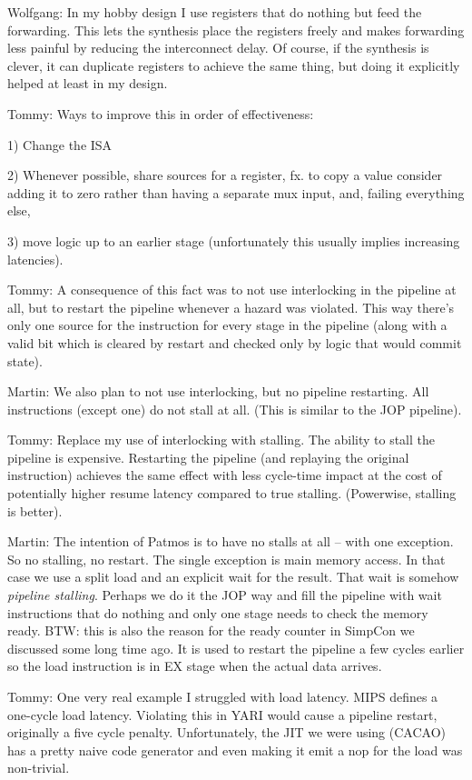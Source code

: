 \documentclass{IEEEtran}
\newcommand{\tommy}[1]{{\color{red} Tommy: #1}}
\newcommand{\wolf}[1]{{\color{OliveGreen} Wolfgang: #1}}
\newcommand{\martin}[1]{{\color{blue} Martin: #1}}
\begin{document}
\wolf{In my hobby design I use registers that do nothing but feed the
forwarding. This lets the synthesis place the registers freely and
makes forwarding less painful by reducing the interconnect delay. Of
course, if the synthesis is clever, it can duplicate registers to
achieve the same thing, but doing it explicitly helped at least in my
design.}

\tommy{Ways to improve this in order of effectiveness:

 1) Change the ISA

 2) Whenever possible, share sources for a register, fx. to copy a
    value consider adding it to zero rather than having a separate
    mux input, and, failing everything else,

 3) move logic up to an earlier stage (unfortunately this usually
    implies increasing latencies).}

 \tommy{A consequence of this fact was to not use interlocking in the
 pipeline at all, but to restart the pipeline whenever a hazard
 was violated. This way there's only one source for the
 instruction for every stage in the pipeline (along with a valid
 bit which is cleared by restart and checked only by logic that
 would commit state).}

\martin{We also plan to not use interlocking, but no pipeline restarting.
All instructions (except one) do not stall at all. (This is similar
to the JOP pipeline).}

\tommy{Replace my use of interlocking with stalling. The ability to
  stall the pipeline is expensive. Restarting the pipeline (and
  replaying the original instruction) achieves the same effect with
  less cycle-time impact at the cost of potentially higher resume
  latency compared to true stalling. (Powerwise, stalling is better).}
  
\martin{The intention of Patmos is to have no stalls at all -- with one
exception. So no stalling, no restart. The single exception is main
memory access. In that case we use a split load and an explicit wait
for the result. That wait is somehow \emph{pipeline stalling}. Perhaps
we do it the JOP way and fill the pipeline with wait instructions that
do nothing and only one stage needs to check the memory ready.
BTW: this is also the reason for the ready counter in SimpCon we
discussed some long time ago. It is used to restart the pipeline a 
few cycles earlier so the load instruction is in EX stage when the actual
data arrives.}

 \tommy{One very real example I struggled with load latency. MIPS
 defines a one-cycle load latency. Violating this in YARI would
 cause a pipeline restart, originally a five cycle penalty.
 Unfortunately, the JIT we were using (CACAO) has a pretty
 naive code generator and even making it emit a nop for the
 load was non-trivial.}
\end{document}

